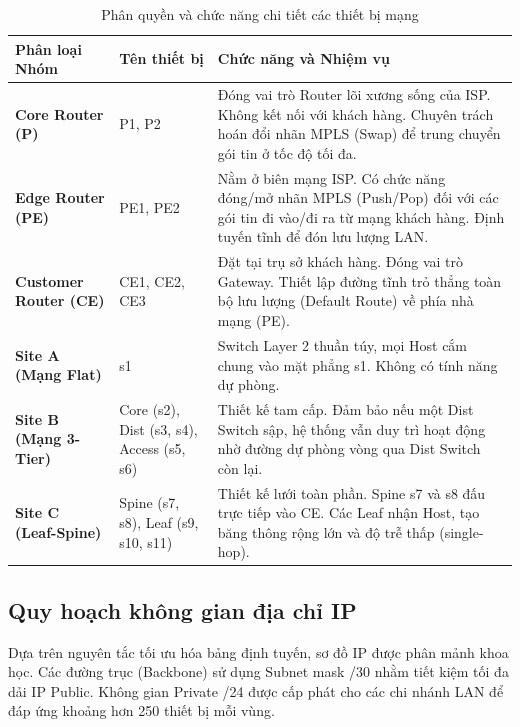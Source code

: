 \begin{table}[H]
    \centering
    \begin{tabular}{|p{3.5cm}|p{3.5cm}|p{7.5cm}|}
    \hline
    \rowcolor[HTML]{2C3E50} 
    \color{white} \textbf{Phân loại Nhóm} & \color{white} \textbf{Tên thiết bị} & \color{white} \textbf{Chức năng và Nhiệm vụ} \\ \hline
    \textbf{Core Router (P)} & P1, P2 & Đóng vai trò Router lõi xương sống của ISP. Không kết nối với khách hàng. Chuyên trách hoán đổi nhãn MPLS (Swap) để trung chuyển gói tin ở tốc độ tối đa. \\ \hline
    \textbf{Edge Router (PE)} & PE1, PE2 & Nằm ở biên mạng ISP. Có chức năng đóng/mở nhãn MPLS (Push/Pop) đối với các gói tin đi vào/đi ra từ mạng khách hàng. Định tuyến tĩnh để đón lưu lượng LAN. \\ \hline
    \textbf{Customer Router (CE)} & CE1, CE2, CE3 & Đặt tại trụ sở khách hàng. Đóng vai trò Gateway. Thiết lập đường tĩnh trỏ thẳng toàn bộ lưu lượng (Default Route) về phía nhà mạng (PE). \\ \hline
    \textbf{Site A (Mạng Flat)} & s1 & Switch Layer 2 thuần túy, mọi Host cắm chung vào mặt phẳng s1. Không có tính năng dự phòng. \\ \hline
    \textbf{Site B (Mạng 3-Tier)} & Core (s2), Dist (s3, s4), Access (s5, s6) & Thiết kế tam cấp. Đảm bảo nếu một Dist Switch sập, hệ thống vẫn duy trì hoạt động nhờ đường dự phòng vòng qua Dist Switch còn lại. \\ \hline
    \textbf{Site C (Leaf-Spine)} & Spine (s7, s8), Leaf (s9, s10, s11) & Thiết kế lưới toàn phần. Spine s7 và s8 đấu trực tiếp vào CE. Các Leaf nhận Host, tạo băng thông rộng lớn và độ trễ thấp (single-hop). \\ \hline
    \end{tabular}
    \caption{Phân quyền và chức năng chi tiết các thiết bị mạng}
    \label{tab:devices_planning}
\end{table}

\subsection{Quy hoạch không gian địa chỉ IP}
Dựa trên nguyên tắc tối ưu hóa bảng định tuyến, sơ đồ IP được phân mảnh khoa học. Các đường trục (Backbone) sử dụng Subnet mask /30 nhằm tiết kiệm tối đa dải IP Public. Không gian Private /24 được cấp phát cho các chi nhánh LAN để đáp ứng khoảng hơn 250 thiết bị mỗi vùng.

